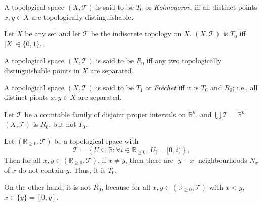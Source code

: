 
\begin{definition}
	[$T_0$ spaces]
	\label{def: T_1 spaces}
	A topological space $(X, \mathcal T)$ is said to be $T_0$ or \textit{Kolmogorov}, iff all distinct points $x,y \in X$ are topologically distinguishable.
\end{definition}


\begin{example}
	Let $X$ be any set and let $\mathcal T$ be the indiscrete topology on $X$. $(X, \mathcal T)$ is $T_0$ iff $|X| \in \{0, 1\}$.
\end{example}




\begin{definition}
	[$R_0$ spaces]
	\label{def: R_0 spaces}
	A topological space $(X, \mathcal T)$ is said to be $R_0$ iff any two topologically distinguishable points in $X$ are separated.
\end{definition}


\begin{definition}
	[$T_1$ Spaces]
	\label{def: T_1 spaces}
	A topological space $(X, \mathcal T)$ is said to be $T_1$ or \textit{Fr\'echet} iff it is $T_0$ and $R_0$; i.e., all distinct pionts $x,y \in X$ are separated.
\end{definition}

\begin{example}
	Let $\mathcal T$ be a countable family of disjoint proper intervals on $\mathbb R^n$, and $\bigcup \mathcal T = \mathbb R^n$. $(X, \mathcal T)$ is $R_0$, but not $T_0$.
\end{example}


\begin{example}
	\label{eg: T_0 but not T_1}
	Let $(\mathbb R_{\ge 0}, \mathcal T)$ be a topological space with
	$$
	\mathcal T = \left\{ U \subseteq \mathbb R : \forall i \in \mathbb R_{\ge 0}, \ U_i = [0, i)  \right\},
	$$
	Then for all $x,y \in (\mathbb R_{\ge 0}, \mathcal T)$, if $x \ne y$, then there are $|y - x|$ neighbourhoods $N_x$ of $x$ do not contain $y$. Thus, it is $T_0$.

	On the other hand, it is not $R_0$, because for all $x, y \in (\mathbb R_{\ge 0}, \mathcal T)$ with $x < y$, $x \in \overline{\{y\}} = [0, y]$.
\end{example}


